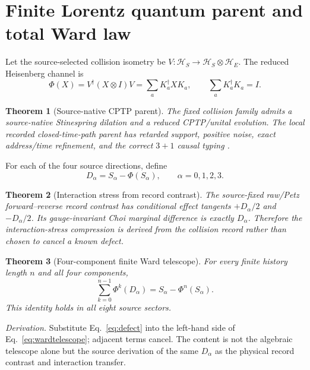 \documentclass[11pt]{article}
\newtheorem{theorem}{Theorem}[section]
\theoremstyle{definition}
\theoremstyle{remark}
\begin{document}
\section{Finite Lorentz quantum parent and total Ward law}

Let the source-selected collision isometry be $V:\mathcal H_S\to\mathcal H_S\otimes\mathcal H_E$. The reduced Heisenberg channel is
\begin{equation}
\Phi(X)=V^\dagger(X\otimes I)V
=\sum_a K_a^\dagger X K_a,
\qquad \sum_aK_a^\dagger K_a=I.
\label{eq:cptp}
\end{equation}

\begin{theorem}[Source-native CPTP parent]
The fixed collision family admits a source-native Stinespring dilation and a reduced CPTP/unital evolution. The local recorded closed-time-path parent has retarded support, positive noise, exact address/time refinement, and the correct $3+1$ causal typing \cite{stinespring1955,gorini1976,lindblad1976,feynmanvernon1963}.
\end{theorem}

For each of the four source directions, define
\begin{equation}
D_\alpha=S_\alpha-\Phi(S_\alpha),
\qquad \alpha=0,1,2,3.
\label{eq:defect}
\end{equation}

\begin{theorem}[Interaction stress from record contrast]
The source-fixed raw/Petz forward--reverse record contrast has conditional effect tangents $+D_\alpha/2$ and $-D_\alpha/2$. Its gauge-invariant Choi marginal difference is exactly $D_\alpha$. Therefore the interaction-stress compression is derived from the collision record rather than chosen to cancel a known defect.
\end{theorem}

\begin{theorem}[Four-component finite Ward telescope]
For every finite history length $n$ and all four components,
\begin{equation}
\sum_{k=0}^{n-1}\Phi^k(D_\alpha)
=S_\alpha-\Phi^n(S_\alpha).
\label{eq:wardtelescope}
\end{equation}
This identity holds in all eight source sectors.
\end{theorem}

\textit{Derivation.} Substitute Eq.~\eqref{eq:defect} into the left-hand side of Eq.~\eqref{eq:wardtelescope}; adjacent terms cancel. The content is not the algebraic telescope alone but the source derivation of the same $D_\alpha$ as the physical record contrast and interaction transfer.
\end{document}

